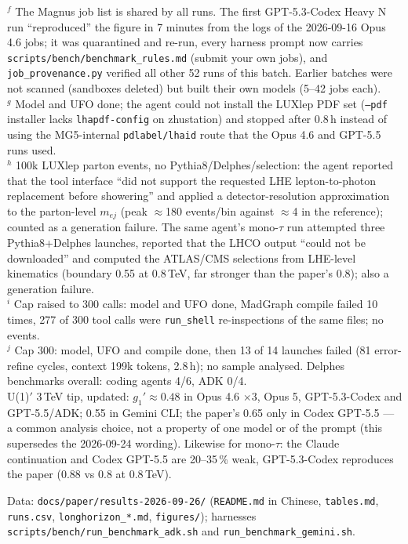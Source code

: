\documentclass[11pt]{article}
\begin{document}
\noindent$^{f}$ The Magnus job list is shared by all runs. The first GPT-5.3-Codex Heavy N run ``reproduced'' the figure in
7 minutes from the logs of the 2026-09-16 Opus 4.6 jobs; it was quarantined and re-run, every harness prompt now
carries \texttt{scripts/bench/benchmark\_rules.md} (submit your own jobs), and \texttt{job\_provenance.py} verified all other
52 runs of this batch. Earlier batches were not scanned (sandboxes deleted) but built their own models (5--42 jobs each).\\
$^{g}$ Model and UFO done; the agent could not install the LUXlep PDF set (\texttt{--pdf} installer lacks
\texttt{lhapdf-config} on zhustation) and stopped after 0.8\,h instead of using the MG5-internal \texttt{pdlabel/lhaid}
route that the Opus 4.6 and GPT-5.5 runs used.\\
$^{h}$ 100k LUXlep parton events, no Pythia8/Delphes/selection: the agent reported that the tool interface ``did not support
the requested LHE lepton-to-photon replacement before showering'' and applied a detector-resolution approximation to the
parton-level $m_{ej}$ (peak $\approx$180 events/bin against $\approx$4 in the reference); counted as a generation failure. The same agent's mono-$\tau$ run attempted three Pythia8+Delphes launches, reported that the LHCO output ``could not be downloaded'' and computed the ATLAS/CMS selections from LHE-level kinematics (boundary 0.55 at 0.8\,TeV, far stronger than the paper's 0.8); also a generation failure.\\
$^{i}$ Cap raised to 300 calls: model and UFO done, MadGraph compile failed 10 times, 277 of 300 tool calls were \texttt{run\_shell} re-inspections of the same files; no events.\\
$^{j}$ Cap 300: model, UFO and compile done, then 13 of 14 launches failed (81 error-refine cycles, context 199k tokens, 2.8\,h); no sample analysed. Delphes benchmarks overall: coding agents 4/6, ADK 0/4.\\
U(1)$'$ 3\,TeV tip, updated: $g_1'\approx0.48$ in Opus 4.6 $\times$3, Opus 5, GPT-5.3-Codex and GPT-5.5/ADK; 0.55 in Gemini
CLI; the paper's 0.65 only in Codex GPT-5.5 --- a common analysis choice, not a property of one model or of the prompt
(this supersedes the 2026-09-24 wording). Likewise for mono-$\tau$: the Claude continuation and Codex GPT-5.5 are 20--35\,\%
weak, GPT-5.3-Codex reproduces the paper (0.88 vs 0.8 at 0.8\,TeV).

Data: \texttt{docs/paper/results-2026-09-26/} (\texttt{README.md} in Chinese, \texttt{tables.md}, \texttt{runs.csv},
\texttt{longhorizon\_*.md}, \texttt{figures/}); harnesses \texttt{scripts/bench/run\_benchmark\_adk.sh} and
\texttt{run\_benchmark\_gemini.sh}.
\end{document}
